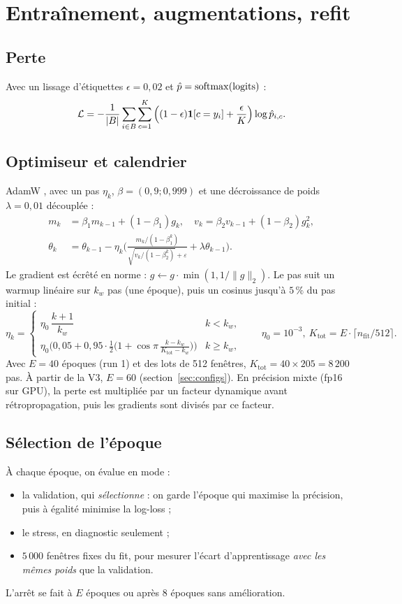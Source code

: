 \section{Entraînement, augmentations, refit}\label{sec:entrainement}

\subsection{Perte}
Avec un lissage d'étiquettes $\epsilon=0{,}02$ et $\hat p=\operatorname{softmax}(\text{logits})$ :
\begin{equation}
\mathcal{L}=-\frac1{|B|}\sum_{i\in B}\sum_{c=1}^{K}\Big((1-\epsilon)\mathbf{1}\!\left[c=y_i\right]+\frac{\epsilon}{K}\Big)\log\hat p_{i,c}.
\end{equation}

\subsection{Optimiseur et calendrier}
AdamW \cite{loshchilov}, avec un pas $\eta_k$, $\beta=(0{,}9;0{,}999)$ et une décroissance de poids $\lambda=0{,}01$ découplée :
\begin{align}
m_k&=\beta_1m_{k-1}+(1-\beta_1)g_k,\quad v_k=\beta_2v_{k-1}+(1-\beta_2)g_k^2,\\
\theta_k&=\theta_{k-1}-\eta_k\Big(\frac{m_k/(1-\beta_1^k)}{\sqrt{v_k/(1-\beta_2^k)}+\varepsilon}+\lambda\theta_{k-1}\Big).
\end{align}
Le gradient est écrêté en norme : $g\leftarrow g\cdot\min(1,1/\|g\|_2)$. Le pas suit un warmup linéaire sur $k_w$ pas (une époque), puis un cosinus jusqu'à $5\,\%$ du pas initial :
\begin{equation}
\eta_k=\begin{cases}\eta_0\,\dfrac{k+1}{k_w}&k<k_w,\\[6pt]
\eta_0\Big(0{,}05+0{,}95\cdot\tfrac12\big(1+\cos\pi\,\tfrac{k-k_w}{K_{\text{tot}}-k_w}\big)\Big)&k\ge k_w,\end{cases}
\qquad \eta_0=10^{-3},\ K_{\text{tot}}=E\cdot\lceil n_{\text{fit}}/512\rceil .
\end{equation}
Avec $E=40$ époques (run 1) et des lots de 512 fenêtres, $K_{\text{tot}}=40\times205=8\,200$ pas. À partir de la V3, $E=60$ (section~\ref{sec:configs}). En précision mixte (fp16 sur GPU), la perte est multipliée par un facteur dynamique avant rétropropagation, puis les gradients sont divisés par ce facteur.

\subsection{Sélection de l'époque}
À chaque époque, on évalue en mode  :
\begin{itemize}
\item la validation, qui \emph{sélectionne} : on garde l'époque qui maximise la précision, puis à égalité minimise la log-loss ;
\item le stress, en diagnostic seulement ;
\item $5\,000$ fenêtres fixes du fit, pour mesurer l'écart d'apprentissage \emph{avec les mêmes poids} que la validation.
\end{itemize}
L'arrêt se fait à $E$ époques ou après 8 époques sans amélioration.

